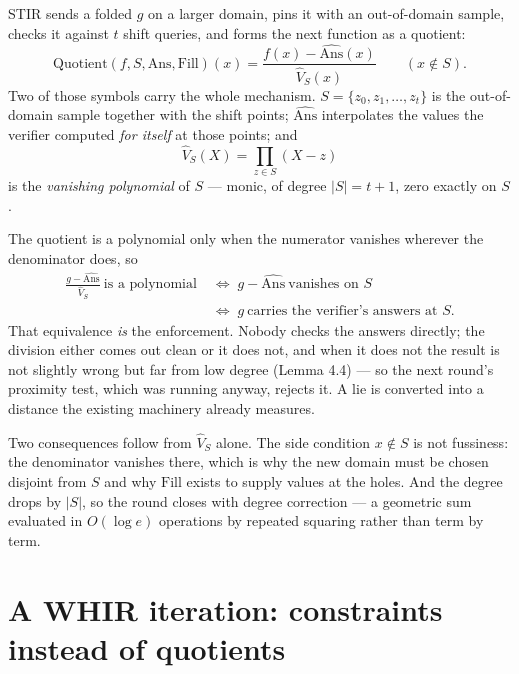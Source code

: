 \documentclass[11pt,a4paper]{article}
\begin{document}
STIR sends a folded $g$ on a larger domain, pins it with an out-of-domain sample, checks it against
$t$ shift queries, and forms the next function as a quotient:
\[
  \mathrm{Quotient}(f,S,\mathrm{Ans},\mathrm{Fill})(x)
  =\frac{f(x)-\widehat{\mathrm{Ans}}(x)}{\hat V_{S}(x)}\qquad (x\notin S).
\]
Two of those symbols carry the whole mechanism. $S=\{z_{0},z_{1},\dots,z_{t}\}$ is the out-of-domain
sample together with the shift points; $\widehat{\mathrm{Ans}}$ interpolates the values the verifier
computed \emph{for itself} at those points; and
\[
  \hat V_{S}(X)=\prod_{z\in S}(X-z)
\]
is the \emph{vanishing polynomial} of $S$ --- monic, of degree $|S|=t+1$, zero exactly on $S$.

The quotient is a polynomial only when the numerator vanishes wherever the denominator does, so
\begin{align*}
  \frac{g-\widehat{\mathrm{Ans}}}{\hat V_{S}}\ \text{is a polynomial}
  \;&\Longleftrightarrow\;
  g-\widehat{\mathrm{Ans}}\ \text{vanishes on } S\\
  \;&\Longleftrightarrow\;
  g\ \text{carries the verifier's answers at } S.
\end{align*}
That equivalence \emph{is} the enforcement. Nobody checks the answers directly; the division either
comes out clean or it does not, and when it does not the result is not slightly wrong but far from
low degree (Lemma 4.4) --- so the next round's proximity test, which was running anyway, rejects it.
A lie is converted into a distance the existing machinery already measures.

Two consequences follow from $\hat V_{S}$ alone. The side condition $x\notin S$ is not fussiness:
the denominator vanishes there, which is why the new domain must be chosen disjoint from $S$ and why
$\mathrm{Fill}$ exists to supply values at the holes. And the degree drops by $|S|$, so the round
closes with degree correction --- a geometric sum evaluated in $O(\log e)$ operations by repeated
squaring rather than term by term.

\section{A WHIR iteration: constraints instead of quotients}
\end{document}

